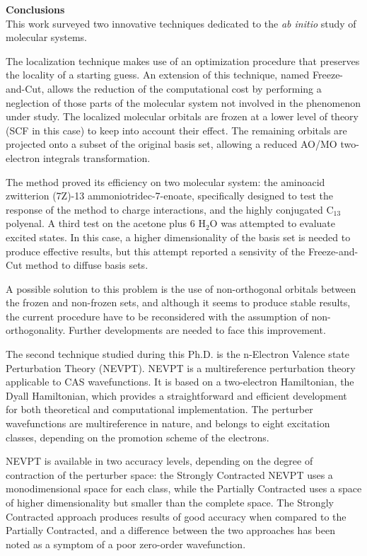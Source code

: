 \thispagestyle{empty}
{ \Huge \textbf{Conclusions} } 
\vspace{1mm} \\

This work surveyed two innovative techniques dedicated to the
\textit{ab initio} study of molecular systems.

The localization technique makes use of an optimization procedure that
preserves the locality of a starting guess.  An extension of this technique,
named Freeze-and-Cut, allows the reduction of the computational cost by
performing a neglection of those parts of the molecular system not involved
in the phenomenon under study. The localized molecular orbitals are
frozen at a lower level of theory (SCF in this case) to keep into account
their effect. The remaining orbitals are projected onto a subset of the
original basis set, allowing a reduced AO/MO two-electron integrals
transformation. 

The method proved its efficiency on two molecular system: the aminoacid
zwitterion (7Z)-13 ammoniotridec-7-enoate, specifically designed to
test the response of the method to charge interactions, and the highly
conjugated C$_{13}$ polyenal.  A third test on the acetone plus 6 H$_2$O was
attempted to evaluate excited states. In this case, a higher dimensionality
of the basis set is needed to produce effective results, but this attempt
reported a sensivity of the Freeze-and-Cut method to diffuse basis sets. 

A possible solution to this problem is the use of non-orthogonal orbitals between the frozen
and non-frozen sets, and although it seems to produce stable results, the
current procedure have to be reconsidered with the assumption of
non-orthogonality. Further developments are needed to face this
improvement.

The second technique studied during this Ph.D. is the n-Electron Valence
state Perturbation Theory (NEVPT). NEVPT is a multireference perturbation
theory applicable to CAS wavefunctions. It is based on a two-electron
Hamiltonian, the Dyall Hamiltonian, which provides a straightforward and
efficient development for both theoretical and computational implementation.
The perturber wavefunctions are multireference in nature, and belongs to
eight excitation classes, depending on the promotion scheme of the
electrons. 

NEVPT is available in two accuracy levels, depending on the degree of
contraction of the perturber space: the Strongly Contracted NEVPT uses a
monodimensional space for each class, while the Partially Contracted uses a
space of higher dimensionality but smaller than the complete space. The
Strongly Contracted approach produces results of good accuracy when compared
to the Partially Contracted, and a difference between the two approaches has
been noted as a symptom of a poor zero-order wavefunction.

